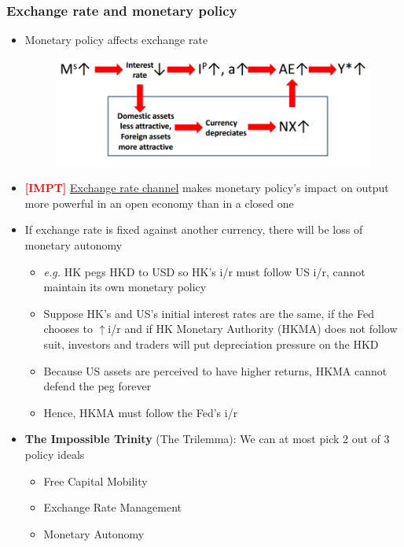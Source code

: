 \documentclass{article}
\newcommand{\eg}[0]{\textit{e.g. }}
\newcommand{\impt}[0]{\textcolor{red}{\textbf{[IMPT] }}}
\begin{document}
\begin{multicols}{2}
\subsubsection{Exchange rate and monetary policy}
\begin{itemize}
	\item Monetary policy affects exchange rate
	\begin{figure}[H]
		\centering
		\includegraphics[width=\columnwidth]{images/xchangerates2.png}
	\end{figure}
    \item \impt \underline{Exchange rate channel} makes monetary policy's impact on output more powerful in an open economy than in a closed one
    \item If exchange rate is fixed against another currency, there will be loss of monetary autonomy
    \begin{itemize}
    	\item \eg HK pegs HKD to USD so HK's i/r must follow US i/r, cannot maintain its own monetary policy
    	\item Suppose HK's and US's initial interest rates are the same, if the Fed chooses to $\uparrow$i/r and if HK Monetary Authority (HKMA) does not follow suit, investors and traders will put depreciation pressure on the HKD
    	\item Because US assets are perceived to have higher returns, HKMA cannot defend the peg forever
    	\item Hence, HKMA must follow the Fed's i/r
    \end{itemize}
    \item \textbf{The Impossible Trinity} (The Trilemma): We can at most pick 2 out of 3 policy ideals
    \begin{itemize}
    	\item Free Capital Mobility
    	\item Exchange Rate Management
    	\item Monetary Autonomy
    \end{itemize}
\end{itemize}

\end{multicols}
\end{document}
